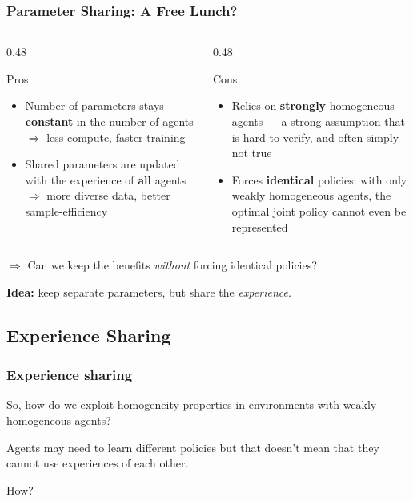 \begin{frame}
\frametitle{Parameter Sharing: A Free Lunch?}

\begin{columns}[T,onlytextwidth]

\begin{column}{0.48\textwidth}
\begin{exampleblock}{Pros}
\small
\begin{itemize}
    \item Number of parameters stays \textbf{constant} in the number
    of agents $\Rightarrow$ less compute, faster training
    \item Shared parameters are updated with the experience of
    \textbf{all} agents $\Rightarrow$ more diverse data,
    better sample-efficiency
\end{itemize}
\end{exampleblock}
\end{column}

\begin{column}{0.48\textwidth}
\begin{alertblock}{Cons}
\small
\begin{itemize}
    \item Relies on \textbf{strongly} homogeneous agents ---
    a strong assumption that is hard to verify, and often
    simply not true
    \item Forces \textbf{identical} policies: with only weakly
    homogeneous agents, the optimal joint policy cannot even
    be represented
\end{itemize}
\end{alertblock}
\end{column}

\end{columns}

\vspace{1.2em}
\centering
$\Rightarrow$ Can we keep the benefits \emph{without} forcing identical
policies?

\vspace{0.3em}
\textbf{Idea:} keep separate parameters, but share the \emph{experience}.

\end{frame}


\subsection{Experience Sharing}
\begin{frame}
    \frametitle{Experience sharing}
    So, how do we exploit homogeneity properties in environments with weakly homogeneous agents?

    Agents may need to learn different policies but that doesn't mean that they cannot use experiences of each other.

    How?

\end{frame}


